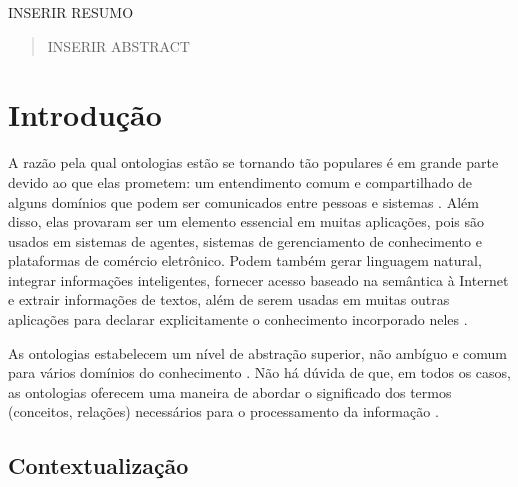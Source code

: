 \documentclass{bcc}
\begin{document}

\capa



\begin{resumo}
INSERIR RESUMO
\end{resumo}

\begin{abstract}
INSERIR ABSTRACT
\end{abstract}

\renewcommand\contentsname{\centerline{Sumário}}
\renewcommand\listfigurename{\centerline{Lista de Figuras}}
\renewcommand\listtablename{\centerline{Lista de Tabelas}}

\tableofcontents

\listoffigures
{}

\listoftables
{}

\inicio
\chapter{Introdução}

A razão pela qual ontologias estão se tornando tão populares é em grande parte devido ao que elas prometem: um entendimento comum e compartilhado de alguns domínios que podem ser comunicados entre pessoas e sistemas \cite{fensel2001}. Além disso, elas provaram ser um elemento essencial em muitas aplicações, pois são usados em sistemas de agentes, sistemas de gerenciamento de conhecimento e plataformas de comércio eletrônico. Podem também gerar linguagem natural, integrar informações inteligentes, fornecer acesso baseado na semântica à Internet e extrair informações de textos, além de serem usadas em muitas outras aplicações para declarar explicitamente o conhecimento incorporado neles \cite{gomez2002}.

As ontologias estabelecem um nível de abstração superior, não ambíguo e comum para vários domínios do conhecimento \cite{rocha2014}. Não há dúvida de que, em todos os casos, as ontologias oferecem uma maneira de abordar o significado dos termos (conceitos, relações) necessários para o processamento da informação \cite{estival2004}.

\section {Contextualização}
\end{document}
